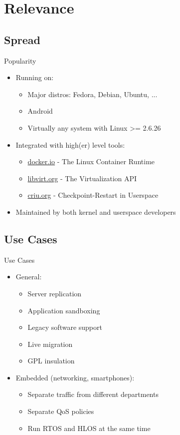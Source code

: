 \section{Relevance}

\subsection{Spread}

\begin{frame}{Popularity}
	\begin{itemize}
	\item Running on:
		\begin{itemize}
		\item Major distros: Fedora, Debian, Ubuntu, ...
		\item Android
		\item Virtually any system with Linux >= 2.6.26
		\end{itemize}
	\item Integrated with high(er) level tools:
		\begin{itemize}
		\item \url{docker.io} - The Linux Container Runtime
		\item \url{libvirt.org} - The Virtualization API
		\item \url{criu.org} - Checkpoint-Restart in Userspace
		\end{itemize}
	\item Maintained by both kernel and userspace developers
	\end{itemize}
\end{frame}

\subsection{Use Cases}

\begin{frame}{Use Cases}
	\begin{itemize}
	\item General:
		\begin{itemize}
		\item Server replication
		\item Application sandboxing
		\item Legacy software support
		\item Live migration
		\item GPL insulation
		\end{itemize}
	\item Embedded (networking, smartphones):
		\begin{itemize}
		\item Separate traffic from different departments
		\item Separate QoS policies
		\item Run RTOS and HLOS at the same time
		\end{itemize}
	\end{itemize}
\end{frame}

